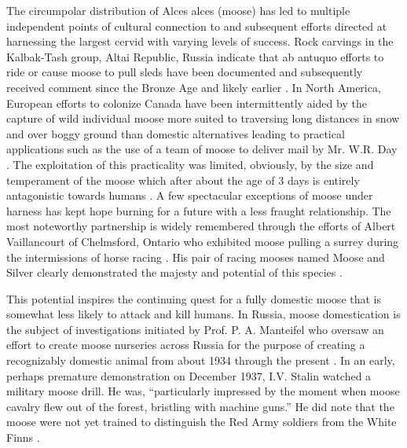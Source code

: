 The circumpolar distribution of Alces alces (moose) has led to multiple independent points of cultural connection to and subsequent efforts directed at harnessing the largest cervid with varying levels of success. 
Rock carvings in the Kalbak-Tash group, Altai Republic, Russia indicate that ab antuquo efforts to ride or cause moose to pull sleds have been documented and subsequently received comment since the Bronze Age and likely earlier \citep{useev_2014}.
In North America, European efforts to colonize Canada have been intermittently aided by the capture of wild individual moose more suited to traversing long distances in snow and over boggy ground than domestic alternatives leading to practical applications such as the use of a team of moose to deliver mail by Mr. W.R. Day \citep{archives_unleashed}.
The exploitation of this practicality was limited, obviously, by the size and temperament of the moose which after about the age of 3 days is entirely antagonistic towards humans \citep{sipko_etal_2019}.
A few spectacular exceptions of moose under harness has kept hope burning for a future with a less fraught relationship. 
The most noteworthy partnership is widely remembered through the efforts of Albert Vaillancourt of Chelmsford, Ontario who exhibited moose pulling a surrey during the intermissions of horse racing \citep{chisholm_2019}.
His pair of racing mooses named Moose and Silver clearly demonstrated the majesty and potential of this species \citep{landry_1941}.
 
This potential inspires the continuing quest for a fully domestic moose that is somewhat less likely to attack and kill humans. 
In Russia, moose domestication is the subject of investigations initiated by Prof. P. A. Manteifel who oversaw an effort to create moose nurseries across Russia for the purpose of creating a recognizably domestic animal from about 1934 through the present \citep{sipko_etal_2019}.
In an early, perhaps premature demonstration on December 1937, I.V. Stalin watched a military moose drill. 
He was, “particularly impressed by the moment when moose cavalry flew out of the forest, bristling with machine guns.” He did note that the moose were not yet trained to distinguish the Red Army soldiers from the White Finns \citep{pererva_2017}.
